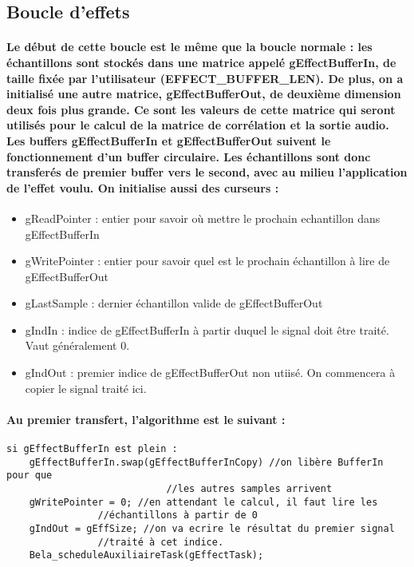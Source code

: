 \documentclass[a4paper]{article}
\begin{document}
\subsection{Boucle d'effets} \paragraph{Le début de cette boucle est le même que
la boucle normale : les échantillons sont stockés dans une matrice appelé
gEffectBufferIn, de taille fixée par l’utilisateur (EFFECT\_BUFFER\_LEN). De
plus, on a initialisé une autre matrice, gEffectBufferOut, de deuxième dimension
deux fois plus grande. Ce sont les valeurs de cette matrice qui seront utilisés
pour le calcul de la matrice de corrélation et la sortie audio. Les buffers
gEffectBufferIn et gEffectBufferOut suivent le fonctionnement d’un buffer
circulaire. Les échantillons sont donc transferés de premier buffer vers le
second, avec au milieu l’application de l’effet voulu. On initialise aussi des
curseurs :}

\begin{itemize} \item gReadPointer : entier pour savoir où mettre le prochain
echantillon dans gEffectBufferIn \item gWritePointer : entier pour savoir quel
est le prochain échantillon à lire de gEffectBufferOut \item gLastSample :
dernier échantillon valide de gEffectBufferOut \item gIndIn : indice de
gEffectBufferIn à partir duquel le signal doit être traité. Vaut généralement 0.
\item gIndOut : premier indice de gEffectBufferOut non utiisé. On commencera à
copier le signal traité ici. \end{itemize}

\paragraph{Au premier transfert, l’algorithme est le suivant :}

\begin{Verbatim}
si gEffectBufferIn est plein :
	gEffectBufferIn.swap(gEffectBufferInCopy) //on libère BufferIn pour que
    						//les autres samples arrivent
	gWritePointer = 0; //en attendant le calcul, il faut lire les
    			//échantillons à partir de 0
	gIndOut = gEffSize; //on va ecrire le résultat du premier signal
    			//traité à cet indice.
	Bela_scheduleAuxiliaireTask(gEffectTask);
\end{Verbatim}
\end{document}
